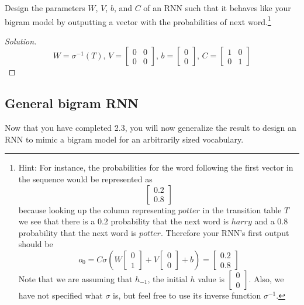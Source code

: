 \documentclass{article}
\begin{document}
Design the parameters $W$, $V$, $b$, and $C$ of an RNN such that it behaves like your bigram model by outputting a vector with the probabilities of next word.\footnote{Hint: For instance, the probabilities for the word following the first vector in the sequence would be represented as
$$ \begin{bmatrix} 0.2 \\ 0.8 \end{bmatrix} $$
because looking up the column representing $potter$ in the transition table $T$ we see that there is a $0.2$ probability that the next word is $harry$ and a 0.8 probability that the next word is $potter$. Therefore your RNN's first output should be
$$ o_0 = C\sigma\left(W\begin{bmatrix} 0 \\ 1 \end{bmatrix} + V\begin{bmatrix} 0 \\ 0 \end{bmatrix} + b\right) = \begin{bmatrix} 0.2 \\ 0.8 \end{bmatrix} $$
Note that we are assuming that $h_{-1}$, the initial $h$ value is $\begin{bmatrix} 0 \\ 0 \end{bmatrix}$. Also, we have not specified what $\sigma$ is, but feel free to use its inverse function $\sigma^{-1}$.}

\begin{proof}[Solution]
    $$ W = \sigma^{-1}(T), \, V = \begin{bmatrix}0&0\\0&0\end{bmatrix}, \, b = \begin{bmatrix}0\\0\end{bmatrix}, \, C = \begin{bmatrix} 1 & 0 \\ 0 & 1 \end{bmatrix} $$
\end{proof}

\subsection{General bigram RNN}
Now that you have completed 2.3, you will now generalize the result to design an RNN to mimic a bigram model for an arbitrarily sized vocabulary.
\end{document}
